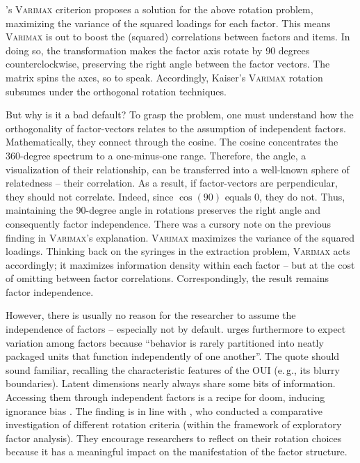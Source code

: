 \documentclass[jou, 11pt]{apa7}
\begin{document}
\textcite{Kaiser1958}'s \textsc{Varimax} criterion proposes a solution for the
above rotation problem, maximizing the variance of the squared loadings for
each factor. This means \textsc{Varimax} is out to boost the (squared)
correlations between factors and items. In doing so, the transformation makes
the factor axis rotate by 90 degrees counterclockwise, preserving the right
angle between the factor vectors. The matrix spins the axes, so to speak.
Accordingly, Kaiser’s \textsc{Varimax} rotation subsumes under the orthogonal
rotation techniques.

But why is it a bad default? To grasp the problem, one must understand how the
orthogonality of factor-vectors relates to the assumption of independent
factors. Mathematically, they connect through the cosine. The cosine
concentrates the 360-degree spectrum to a one-minus-one range. Therefore, the
angle, a visualization of their relationship, can be transferred into a
well-known sphere of relatedness -- their correlation. As a result, if
factor-vectors are perpendicular, they should not correlate. Indeed, since
$\cos(90)$ equals 0, they do not. Thus, maintaining the 90-degree angle in
rotations preserves the right angle and consequently factor independence. There
was a cursory note on the previous finding in \textsc{Varimax}'s explanation.
\textsc{Varimax} maximizes the variance of the squared loadings. Thinking back
on the syringes in the extraction problem, \textsc{Varimax} acts accordingly; it
maximizes information density within each factor -- but at the cost of omitting
between factor correlations. Correspondingly, the result remains factor
independence.

However, there is usually no reason for the researcher to assume the
independence of factors -- especially not by default.
\textcite[p.3]{Costello2005} urges furthermore to expect variation among
factors because \enquote{behavior is rarely partitioned into neatly packaged
units that function independently of one another}. The quote should sound
familiar, recalling the characteristic features of the OUI (e.\,g., its blurry
boundaries). Latent dimensions nearly always share some bits of information.
Accessing them through independent factors is a recipe for doom, inducing
ignorance bias \parencite{Loo1979}. The finding is in line with
\textcite{Sass2010}, who conducted a comparative investigation of different
rotation criteria (within the framework of exploratory factor analysis). They
encourage researchers to reflect on their rotation choices because it has a
meaningful impact on the manifestation of the factor structure. 
\end{document}
